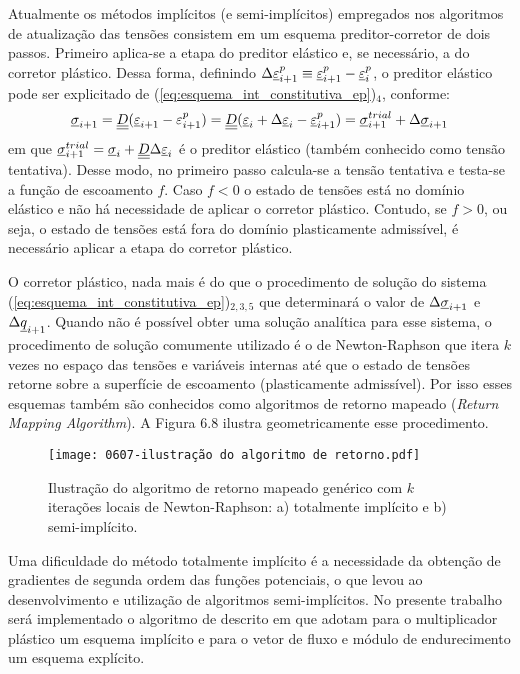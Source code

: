 Atualmente os métodos implícitos (e semi-implícitos) empregados nos algoritmos de atualização das tensões consistem em um esquema preditor-corretor de dois passos. Primeiro aplica-se a etapa do preditor elástico e, se necessário, a do corretor plástico. Dessa forma, definindo $\Delta \underline{\varepsilon}_{i+1}^p \equiv \underline{\varepsilon}_{i+1}^p - \underline{\varepsilon}_{i}^p$, o preditor elástico pode ser explicitado de (\ref{eq:esquema_int_constitutiva_ep})$_4$, conforme:
\begin{equation}
	\label{eq:preditor_elastico}
	\underline \sigma_{i+1} = \underline{\underline D}(\underline{\varepsilon}_{i+1}-\varepsilon_{i+1}^p) = \underline{\underline D}(\underline{\varepsilon}_i+\Delta \underline{\varepsilon}_i-\underline{\varepsilon}_{i+1}^ p) = \underline \sigma_{i+1}^{trial} + \Delta \underline \sigma_{i+1}
\end{equation}
em que $\underline \sigma_{i+1}^{trial} = \underline \sigma_i + \underline{\underline D} \Delta \underline{\varepsilon}_i$ é o preditor elástico (também conhecido como tensão tentativa). Desse modo, no primeiro passo calcula-se a tensão tentativa e testa-se a função de escoamento $f$. Caso $f<0$ o estado de tensões está no domínio elástico e não há necessidade de aplicar o corretor plástico. Contudo, se $f>0$, ou seja, o estado de tensões está fora do domínio plasticamente admissível, é necessário aplicar a etapa do corretor plástico.

O corretor plástico, nada mais é do que o procedimento de solução do sistema (\ref{eq:esquema_int_constitutiva_ep})$_{2,3,5}$ que determinará o valor de $\Delta \underline \sigma_{i+1}$ e $\Delta \underline q_{i+1}$. Quando não é possível obter uma solução analítica para esse sistema, o procedimento de solução comumente utilizado é o de Newton-Raphson que itera $k$ vezes no espaço das tensões e variáveis internas até que o estado de tensões retorne sobre a superfície de escoamento (plasticamente admissível). Por isso esses esquemas também são conhecidos como algoritmos de retorno mapeado (\textit{Return Mapping Algorithm}). A Figura 6.8 ilustra geometricamente esse procedimento.

\begin{figure}[H]
	\begin{center}
		\texttt{[image: 0607-ilustração do algoritmo de retorno.pdf]}
	\end{center}
	\caption{\label{algoritmo_retorno}Ilustração do algoritmo de retorno mapeado genérico com $k$ iterações locais de Newton-Raphson: a) totalmente implícito e b) semi-implícito.}
\end{figure}

Uma dificuldade do método totalmente implícito é a necessidade da obtenção de gradientes de segunda ordem das funções potenciais, o que levou ao desenvolvimento e utilização de algoritmos semi-implícitos. No presente trabalho será implementado o algoritmo de  descrito em  que adotam para o multiplicador plástico um esquema implícito e para o vetor de fluxo e módulo de endurecimento um esquema explícito.

